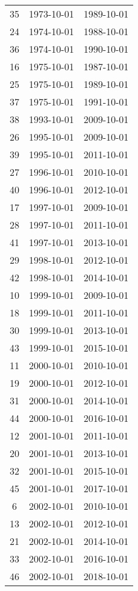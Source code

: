 % 
\begin{tabular}{ccc}
  \hline
  \hline
35 & 1973-10-01 & 1989-10-01 \\ 
  24 & 1974-10-01 & 1988-10-01 \\ 
  36 & 1974-10-01 & 1990-10-01 \\ 
  16 & 1975-10-01 & 1987-10-01 \\ 
  25 & 1975-10-01 & 1989-10-01 \\ 
  37 & 1975-10-01 & 1991-10-01 \\ 
  38 & 1993-10-01 & 2009-10-01 \\ 
  26 & 1995-10-01 & 2009-10-01 \\ 
  39 & 1995-10-01 & 2011-10-01 \\ 
  27 & 1996-10-01 & 2010-10-01 \\ 
  40 & 1996-10-01 & 2012-10-01 \\ 
  17 & 1997-10-01 & 2009-10-01 \\ 
  28 & 1997-10-01 & 2011-10-01 \\ 
  41 & 1997-10-01 & 2013-10-01 \\ 
  29 & 1998-10-01 & 2012-10-01 \\ 
  42 & 1998-10-01 & 2014-10-01 \\ 
  10 & 1999-10-01 & 2009-10-01 \\ 
  18 & 1999-10-01 & 2011-10-01 \\ 
  30 & 1999-10-01 & 2013-10-01 \\ 
  43 & 1999-10-01 & 2015-10-01 \\ 
  11 & 2000-10-01 & 2010-10-01 \\ 
  19 & 2000-10-01 & 2012-10-01 \\ 
  31 & 2000-10-01 & 2014-10-01 \\ 
  44 & 2000-10-01 & 2016-10-01 \\ 
  12 & 2001-10-01 & 2011-10-01 \\ 
  20 & 2001-10-01 & 2013-10-01 \\ 
  32 & 2001-10-01 & 2015-10-01 \\ 
  45 & 2001-10-01 & 2017-10-01 \\ 
  6 & 2002-10-01 & 2010-10-01 \\ 
  13 & 2002-10-01 & 2012-10-01 \\ 
  21 & 2002-10-01 & 2014-10-01 \\ 
  33 & 2002-10-01 & 2016-10-01 \\ 
  46 & 2002-10-01 & 2018-10-01 \\ 

\end{tabular}
